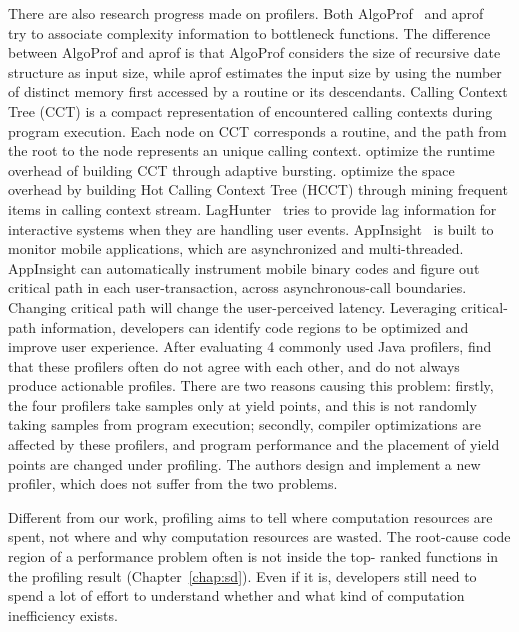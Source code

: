 There are also research progress made on profilers. 
Both AlgoProf~\citep{AlgoProf} and aprof~\citep{Aprof1, Aprof2} try to associate complexity information to bottleneck functions. 
The difference between AlgoProf and aprof is that 
AlgoProf considers the size of recursive date structure as input size, 
while aprof estimates the input size by using the number of distinct 
memory first accessed by a routine or its descendants.
Calling Context Tree (CCT) is a compact representation of encountered calling contexts during program execution. 
Each node on CCT corresponds a routine, and the path from the root to the node represents an unique calling context. 
\citet{AdaptiveBurst} optimize the runtime overhead of building CCT through adaptive bursting. 
\citet{HotCallingContext} optimize the space overhead by building 
Hot Calling Context Tree (HCCT) through mining frequent items in calling context stream. 
LagHunter~\citep{LagHunter} tries to provide lag information for interactive systems when they are handling user events. 
AppInsight~\citep{AppInsight} is built to monitor mobile applications, which are asynchronized and multi-threaded. 
AppInsight can automatically instrument mobile binary codes and figure out critical path in each user-transaction, across asynchronous-call boundaries. 
Changing critical path will change the user-perceived latency. 
Leveraging critical-path information, developers can identify code regions to be optimized 
and improve user experience. 
After evaluating 4 commonly used Java profilers, 
\citet{4Profilers} find that these profilers often do not agree with each other, 
and do not always produce actionable profiles. 
There are two reasons causing this problem: 
firstly, the four profilers take samples only at yield points, 
and this is not randomly taking samples from program execution; 
secondly, compiler optimizations are affected by these profilers, 
and program performance and the placement of yield points are changed under profiling. 
The authors design and implement a new profiler, which does not suffer from the two problems. 

Different from our work, profiling aims to tell
where computation resources are spent, not where and why
computation resources are wasted. The root-cause code region 
of a performance problem often is not inside the top-
ranked functions in the profiling result (Chapter~\ref{chap:sd}). 
Even if it is,
developers still need to spend a lot of effort to understand
whether and what kind of computation inefficiency exists.


